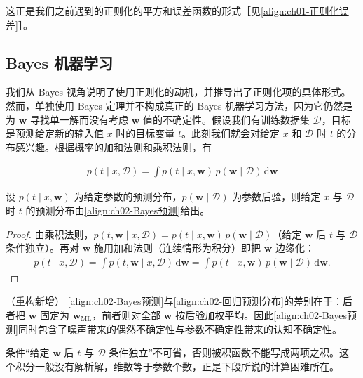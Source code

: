 \documentclass[../../main.tex]{subfiles}
\begin{document}
这正是我们之前遇到的正则化的平方和误差函数的形式［见\eqref{align:ch01-正则化误差}］。

\subsection{Bayes 机器学习}\label{subsection:ch02-Bayes机器学习}

我们从 Bayes 视角说明了使用正则化的动机，并推导出了正则化项的具体形式。然而，单独使用 Bayes 定理并不构成真正的 Bayes 机器学习方法，因为它仍然是为 $\mathbf{w}$ 寻找单一解而没有考虑 $\mathbf{w}$ 值的不确定性。假设我们有训练数据集 $\mathcal{D}$，目标是预测给定新的输入值 $x$ 时的目标变量 $t$。此刻我们就会对给定 $x$ 和 $\mathcal{D}$ 时 $t$ 的分布感兴趣。根据概率的加和法则和乘积法则，有

\begin{align}
  p(t\mid x,\mathcal{D}) = \int p(t\mid x,\mathbf{w})\,p(\mathbf{w}\mid\mathcal{D})\,\mathrm{d}\mathbf{w}
  \label{align:ch02-Bayes预测}
\end{align}

\begin{proposition}\label{proposition:ch02-Bayes预测}
设 $p(t\mid x,\mathbf{w})$ 为给定参数的预测分布，$p(\mathbf{w}\mid\mathcal{D})$ 为参数后验，则给定 $x$ 与 $\mathcal{D}$ 时 $t$ 的预测分布由\eqref{align:ch02-Bayes预测}给出。
\end{proposition}

\begin{proof}
由乘积法则，$p(t,\mathbf{w}\mid x,\mathcal{D})=p(t\mid x,\mathbf{w})\,p(\mathbf{w}\mid\mathcal{D})$（给定 $\mathbf{w}$ 后 $t$ 与 $\mathcal{D}$ 条件独立）。再对 $\mathbf{w}$ 施用加和法则（连续情形为积分）即把 $\mathbf{w}$ 边缘化：
\begin{align*}
  p(t\mid x,\mathcal{D}) = \int p(t,\mathbf{w}\mid x,\mathcal{D})\,\mathrm{d}\mathbf{w}
  = \int p(t\mid x,\mathbf{w})\,p(\mathbf{w}\mid\mathcal{D})\,\mathrm{d}\mathbf{w} .
\end{align*}
\end{proof}

\begin{remark}（重构新增）
\eqref{align:ch02-Bayes预测}与\eqref{align:ch02-回归预测分布}的差别在于：后者把 $\mathbf{w}$ 固定为 $\mathbf{w}_{\mathrm{ML}}$，前者则对全部 $\mathbf{w}$ 按后验加权平均。因此\eqref{align:ch02-Bayes预测}同时包含了噪声带来的偶然不确定性与参数不确定性带来的认知不确定性。

条件“给定 $\mathbf{w}$ 后 $t$ 与 $\mathcal{D}$ 条件独立”不可省，否则被积函数不能写成两项之积。这个积分一般没有解析解，维数等于参数个数，正是下段所说的计算困难所在。
\end{remark}
\end{document}
